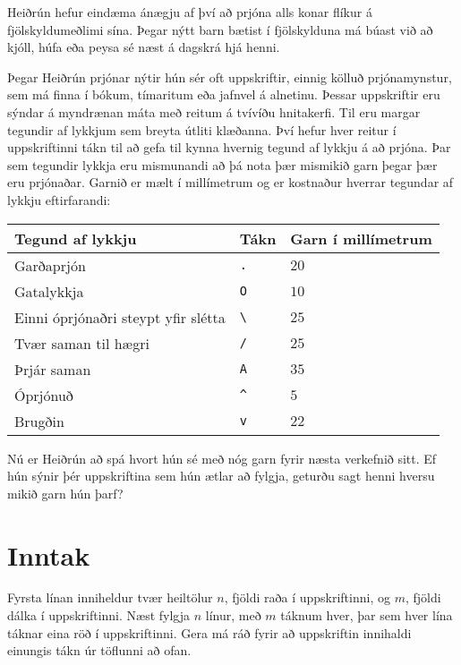 
Heiðrún hefur eindæma ánægju af því að prjóna alls konar flíkur á fjölskyldumeðlimi sína.
Þegar nýtt barn bætist í fjölskylduna má búast við að kjóll, húfa eða peysa sé næst á dagskrá hjá henni.

Þegar Heiðrún prjónar nýtir hún sér oft uppskriftir, einnig kölluð prjónamynstur, sem má finna í bókum, tímaritum eða jafnvel á alnetinu.
Þessar uppskriftir eru sýndar á myndrænan máta með reitum á tvívíðu hnitakerfi.
Til eru margar tegundir af lykkjum sem breyta útliti klæðanna.
Því hefur hver reitur í uppskriftinni tákn til að gefa til kynna hvernig tegund af lykkju á að prjóna.
Þar sem tegundir lykkja eru mismunandi að þá nota þær mismikið garn þegar þær eru prjónaðar.
Garnið er mælt í millímetrum og er kostnaður hverrar tegundar af lykkju eftirfarandi:

\begin{tabular}{|l|l|l|}
    \hline
    Tegund af lykkju                              & Tákn                    & Garn í millímetrum \\ \hline
    Garðaprjón                          & \texttt{.}              & $20$ \\ \hline
    Gatalykkja                          & \texttt{O}              & $10$ \\ \hline
    Einni óprjónaðri steypt yfir slétta & \texttt{\textbackslash} & $25$ \\ \hline
    Tvær saman til hægri                & \texttt{/}              & $25$ \\ \hline
    Þrjár saman                         & \texttt{A}              & $35$ \\ \hline
    Óprjónuð                            & \texttt{\^{}}           & $5$  \\ \hline
    Brugðin                             & \texttt{v}              & $22$ \\ \hline
\end{tabular}

Nú er Heiðrún að spá hvort hún sé með nóg garn fyrir næsta verkefnið sitt.
Ef hún sýnir þér uppskriftina sem hún ætlar að fylgja, geturðu sagt henni hversu mikið garn hún þarf?

\section*{Inntak}
Fyrsta línan inniheldur tvær heiltölur $n$, fjöldi raða í uppskriftinni, og $m$, fjöldi dálka í uppskriftinni.
Næst fylgja $n$ línur, með $m$ táknum hver, þar sem hver lína táknar eina röð í uppskriftinni.
Gera má ráð fyrir að uppskriftin innihaldi einungis tákn úr töflunni að ofan.

